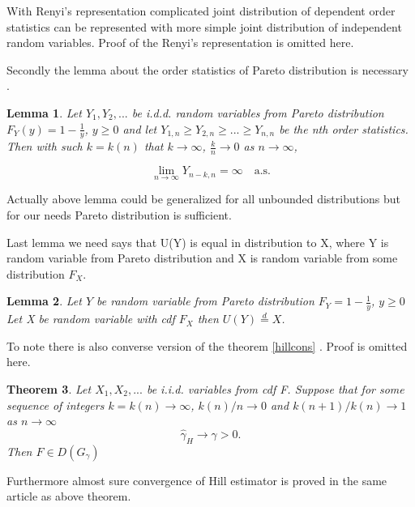 \documentclass[english,12pt,a4paper,pdftex,sci,utf8]{aaltothesis} %
\newtheorem{theorem}{Theorem}[section]
\newtheorem{lemma}[theorem]{Lemma}
\begin{document}
With Renyi's representation complicated joint distribution of dependent order statistics can be represented with more simple joint distribution of independent random variables. Proof of the Renyi's representation is omitted here.

Secondly the lemma about the order statistics of Pareto distribution is necessary \cite{deHaan}.

\begin{lemma}
Let $Y_1, Y_2, ...$ be i.d.d. random variables from Pareto distribution $F_Y(y)=1-\frac{1}{y}$, $y \geq 0$ and let $Y_{1,n} \geq Y_{2,n} \geq ... \geq Y_{n,n}$ be the nth order statistics. Then with such $k=k(n)$ that $k \rightarrow \infty$, $\frac{k}{n} \rightarrow 0$ as $n \rightarrow \infty$,

\begin{equation*}
\lim_{n\to\infty} Y_{n-k,n} = \infty  \quad  \text{a.s}.
\end{equation*}
\label{asconv}
\end{lemma}

Actually above lemma could be generalized for all unbounded distributions but for our needs Pareto distribution is sufficient.


Last lemma we need says that U(Y) is equal in distribution to X, where Y is random variable from Pareto distribution and X is random variable from some distribution $F_X$.

\begin{lemma}
Let $Y$ be random variable from Pareto distribution $F_Y=1-\frac{1}{y}$, $y \geq 0$ Let X be random variable with cdf $F_X$ then $U(Y) \overset{d}{=} X$.
\label{U}
\end{lemma}




To note there is also converse version of the theorem \ref{hillcons} \cite{mason}. Proof is omitted here.

\begin{theorem}
Let $X_1, X_2,...$ be i.i.d. variables from cdf F. Suppose that for some sequence of integers $k=k(n) \rightarrow \infty$, $k(n)/n \rightarrow 0$ and $k(n+1)/k(n) \rightarrow 1$ as $n \rightarrow \infty$
\begin{equation*}
\hat{\gamma}_H \rightarrow \gamma > 0.
\end{equation*}
Then $F \in D(G_{\gamma})$
\end{theorem}

Furthermore almost sure convergence of Hill estimator is proved in the same article \cite{mason} as above theorem.
\end{document}
